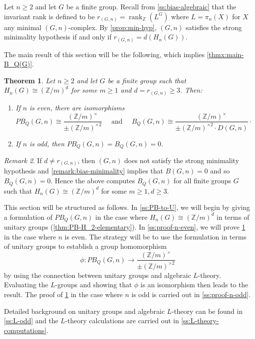 \documentclass[11pt,a4paper,leqno]{amsart}
\newtheorem{theorem}{Theorem}[section]
\theoremstyle{definition}
\theoremstyle{remark}
\newtheorem{remark}[theorem]{Remark}
\newenvironment{clist}[1]
{\begin{enumerate}[\normalfont #1]}
{\end{enumerate}}
\newcommand{\cy}[1]{\Z/{#1}}
\newcommand{\Z}{\mathbb{Z}}
\DeclareMathOperator{\rank}{rank}
\begin{document}
Let $n \ge 2$ and let $G$ be a finite group. Recall from \cref{ss:bias-algebraic} that the invariant rank is defined to be $r_{(G,n)} = \rank_{\Z}(L^G)$ where $L = \pi_n(X)$ for $X$ any minimal $(G,n)$-complex. By \cref{prop:min-hyp}, $(G,n)$ satisfies the strong minimality hypothesis if and only if $r_{(G,n)} = d(H_n(G))$.

The main result of this section will be the following, which implies \cref{thmx:main-B_Q(G)}.

\begin{theorem}\label{thm:BQ-main}
Let $n \ge 2$ and let $G$ be a finite group such that $H_n(G) \cong (\Z/m)^d$ for some $m \ge 1$ and $d = r_{(G,n)}\geq 3$. Then:
\begin{clist}{(i)}
\item If $n$ is even, there are isomorphisms 
\[ PB_Q(G,n) \cong 
\frac{(\Z/m)^\times}{\pm (\cy m)^{\times 2}}
 \quad \text{\ and\ } \quad  B_Q(G,n) \cong  
 \frac{(\Z/m)^\times}{\pm (\cy m)^{\times 2}\cdot D(G,n)} \cdot
 \]
 \item If $n$ is odd, then $PB_Q(G,n) = B_Q(G,n) =0$.
 \end{clist}
\end{theorem}

\begin{remark}
If $d \ne r_{(G,n)}$, then $(G,n)$ does not satisfy the strong minimality hypothesis and \cref{remark:bias-minimality} implies that $B(G,n)=0$ and so $B_Q(G,n)=0$. Hence the above computes $B_Q(G,n)$ for all finite groups $G$ such that $H_n(G) \cong (\Z/m)^d$ for some $m \ge 1, d \ge 3$.
\end{remark}

This section will be structured as follows. In \cref{ss:PB-to-U}, we will begin by giving a formulation of $PB_Q(G,n)$ in the case where $H_n(G) \cong (\Z/m)^d$ in terms of unitary groups (\cref{thm:PB-H_2-elementary}).
In \cref{ss:proof-n-even}, we will prove \cref{thm:BQ-main} in the case where $n$ is even. The strategy will be to use the formulation in terms of unitary groups to establish a group homomorphism
\[ \phi\colon PB_Q(G,n) \longrightarrow \frac{(\Z/m)^\times}{\pm (\cy m)^{\times 2}} \]
by using the connection between unitary groups and algebraic $L$-theory.
Evaluating the $L$-groups and showing that $\phi$ is an isomorphism then leads to the result. The proof of \cref{thm:BQ-main} in the case where $n$ is odd is carried out in \cref{ss:proof-n-odd}. 

Detailed background on unitary groups and algebraic $L$-theory can be found in \cref{ss:L-odd} and the $L$-theory calculations are carried out in \cref{ss:L-theory-computations}.
\end{document}

